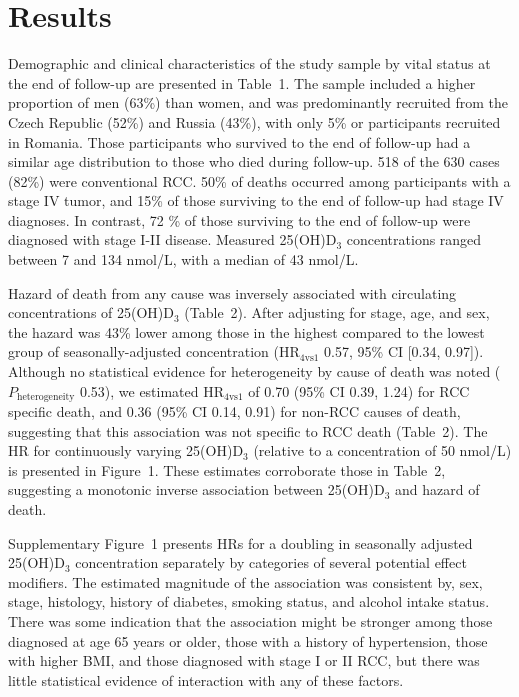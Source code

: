 \documentclass[a4paper,11pt]{article}
\begin{document}
\section*{Results}
Demographic and clinical characteristics of the study sample by vital status at 
the end of follow-up are presented in Table~1. The sample included a higher 
proportion of men (63\%) than women, and was predominantly recruited from the 
Czech Republic (52\%) and Russia (43\%), with only 5\% or participants 
recruited in Romania. Those participants who survived to the end of follow-up 
had a similar age distribution to those who died during follow-up. 518 
of the 630 cases (82\%) were conventional RCC. 50\% of deaths occurred among 
participants with a stage IV tumor, and 15\% of those surviving to the end of 
follow-up had stage IV diagnoses. In contrast, 72 \% of those surviving to the 
end of follow-up were diagnosed with stage I-II disease. Measured 25(OH)D$_3$ 
concentrations ranged between 7 and 134 nmol/L, with a median of 43 nmol/L.

Hazard of death from any cause was inversely associated with 
circulating concentrations of 25(OH)D$_3$ (Table~2). After adjusting for 
stage, age, and sex, the hazard was 43\% lower among those in the highest 
compared to the lowest group of seasonally-adjusted concentration 
(HR$_{4\text{vs}1}$ 0.57, 95\% CI [0.34, 0.97]). Although no statistical 
evidence for heterogeneity by cause of death was noted 
($P_\text{heterogeneity}$ 0.53), we estimated HR$_{4\text{vs}1}$ of 0.70 
(95\% CI 0.39, 1.24) for RCC specific death, and 0.36 (95\% CI 0.14, 0.91) for 
non-RCC causes of death, suggesting that this association was not specific to 
RCC death (Table~2). The HR for continuously varying 25(OH)D$_3$ (relative to a 
concentration of 50 nmol/L) is presented in Figure~1. These estimates 
corroborate those in Table~2, suggesting a monotonic inverse association between 
25(OH)D$_3$ and hazard of death.

Supplementary Figure~1 presents HRs for a doubling in seasonally adjusted 
25(OH)D$_3$ concentration separately by categories of several potential effect 
modifiers. The estimated magnitude of the association was consistent by, sex, stage, 
histology, history of diabetes, smoking status, and alcohol intake status. 
There was some indication that the association might be stronger among those 
diagnosed at age 65 years or older, those with a history of hypertension, those 
with higher BMI, and those diagnosed with stage I or II RCC, but there was 
little statistical evidence of interaction with any of these factors. 
\end{document}
